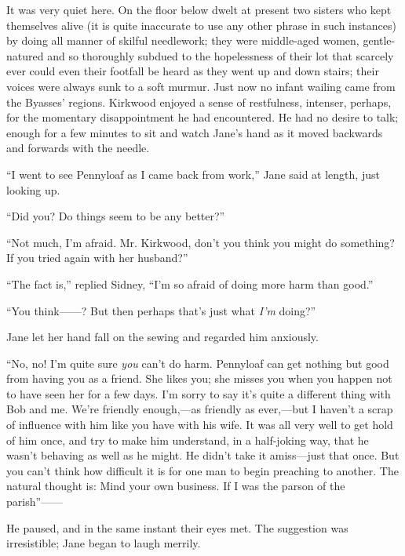 It was very quiet here. On the floor below dwelt at present two sisters
who kept themselves alive (it is quite inaccurate to use any other
phrase in such instances) by doing all manner of skilful needlework;
they were middle-aged women, gentle-natured and so thoroughly subdued to
the hopelessness of their lot that scarcely ever could even their
footfall be heard as they went up and down stairs; their voices were
always sunk to a soft murmur. Just now no infant wailing came from the
Byasses' regions. Kirkwood {\protect\hypertarget{44}{}{}}enjoyed a sense
of restfulness, intenser, perhaps, for the momentary disappointment he
had encountered. He had no desire to talk; enough for a few minutes to
sit and watch Jane's hand as it moved backwards and forwards with the
needle.

``I went to see Pennyloaf as I came back from work,'' Jane said at
length, just looking up.

``Did you? Do things seem to be any better?''

``Not much, I'm afraid. Mr. Kirkwood, don't you think you might do
something? If you tried again with her husband?''

``The fact is,'' replied Sidney, ``I'm so afraid of doing more harm than
good.''

``You think{{------}}? But then perhaps that's just what \emph{I'm}
doing?''

Jane let her hand fall on the sewing and regarded him anxiously.

``No, no! I'm quite sure \emph{you} can't do harm. Pennyloaf can get
nothing but good from having you as a friend. She likes you; she misses
you when you happen not to have {\protect\hypertarget{45}{}{}}seen her
for a few days. I'm sorry to say it's quite a different thing with Bob
and me. We're friendly enough,---as friendly as ever,---but I haven't a
scrap of influence with him like you have with his wife. It was all very
well to get hold of him once, and try to make him understand, in a
half-joking way, that he wasn't behaving as well as he might. He didn't
take it amiss---just that once. But you can't think how difficult it is
for one man to begin preaching to another. The natural thought is: Mind
your own business. If I was the parson of the parish''{{------}}

He paused, and in the same instant their eyes met. The suggestion was
irresistible; Jane began to laugh merrily.

